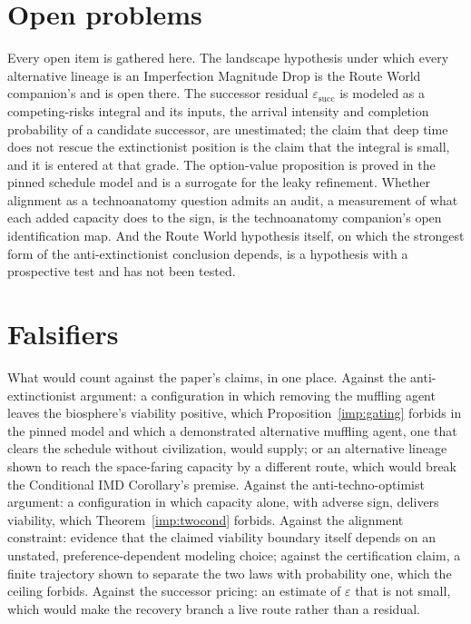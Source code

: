 \documentclass[11pt]{article}
\theoremstyle{plain}
\theoremstyle{definition}
\theoremstyle{remark}
\begin{document}
\section{Open problems}\label{sec:open}

Every open item is gathered here. The landscape hypothesis under which
every alternative lineage is an Imperfection Magnitude Drop is the Route
World companion's and is open there. The successor residual
$\varepsilon_{\mathrm{succ}}$ is modeled as a competing-risks integral
and its inputs, the arrival intensity and completion probability of a
candidate successor, are unestimated; the claim that deep time does not
rescue the extinctionist position is the claim that the integral is
small, and it is entered at that grade. The option-value proposition is
proved in the pinned schedule model and is a surrogate for the leaky
refinement. Whether alignment as a technoanatomy question
admits an audit, a measurement of what each added capacity does to the
sign, is the technoanatomy companion's open identification map. And the
Route World hypothesis itself, on which the strongest form of the
anti-extinctionist conclusion depends, is a hypothesis with a
prospective test and has not been tested.

\section{Falsifiers}\label{sec:falsifiers}

What would count against the paper's claims, in one place. Against the
anti-extinctionist argument: a configuration in which removing the
muffling agent leaves the biosphere's viability positive, which
Proposition~\ref{imp:gating} forbids in the pinned model and which a
demonstrated alternative muffling agent, one that clears the schedule
without civilization, would supply; or an alternative lineage shown to
reach the space-faring capacity by a different route, which would break
the Conditional IMD Corollary's premise. Against the anti-techno-optimist
argument: a configuration in which capacity alone, with adverse sign,
delivers viability, which Theorem~\ref{imp:twocond} forbids. Against
the alignment constraint: evidence that the claimed viability boundary
itself depends on an unstated, preference-dependent modeling choice;
against the certification claim, a finite trajectory shown to separate the two laws
with probability one, which the ceiling forbids. Against the successor
pricing: an estimate of $\varepsilon$ that is not small, which would
make the recovery branch a live route rather than a residual.
\end{document}
